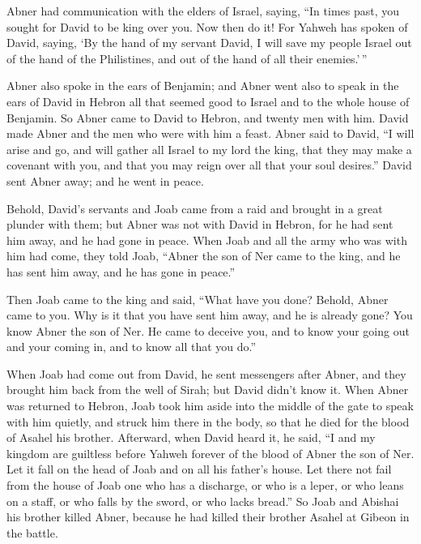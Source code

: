  Abner had communication with the elders of Israel,
saying, ``In times past, you sought for David to be king over you.
 Now then do it! For Yahweh has spoken of David, saying,
`By the hand of my servant David, I will save my people Israel out of
the hand of the Philistines, and out of the hand of all their
enemies.'\,''

 Abner also spoke in the ears of Benjamin; and Abner went
also to speak in the ears of David in Hebron all that seemed good to
Israel and to the whole house of Benjamin.  So Abner came
to David to Hebron, and twenty men with him. David made Abner and the
men who were with him a feast.  Abner said to David, ``I
will arise and go, and will gather all Israel to my lord the king, that
they may make a covenant with you, and that you may reign over all that
your soul desires.'' David sent Abner away; and he went in peace.

 Behold, David's servants and Joab came from a raid and
brought in a great plunder with them; but Abner was not with David in
Hebron, for he had sent him away, and he had gone in peace.
 When Joab and all the army who was with him had come,
they told Joab, ``Abner the son of Ner came to the king, and he has sent
him away, and he has gone in peace.''

 Then Joab came to the king and said, ``What have you
done? Behold, Abner came to you. Why is it that you have sent him away,
and he is already gone?  You know Abner the son of Ner.
He came to deceive you, and to know your going out and your coming in,
and to know all that you do.''

 When Joab had come out from David, he sent messengers
after Abner, and they brought him back from the well of Sirah; but David
didn't know it.  When Abner was returned to Hebron, Joab
took him aside into the middle of the gate to speak with him quietly,
and struck him there in the body, so that he died for the blood of
Asahel his brother.  Afterward, when David heard it, he
said, ``I and my kingdom are guiltless before Yahweh forever of the
blood of Abner the son of Ner.  Let it fall on the head
of Joab and on all his father's house. Let there not fail from the house
of Joab one who has a discharge, or who is a leper, or who leans on a
staff, or who falls by the sword, or who lacks bread.'' 
So Joab and Abishai his brother killed Abner, because he had killed
their brother Asahel at Gibeon in the battle.


